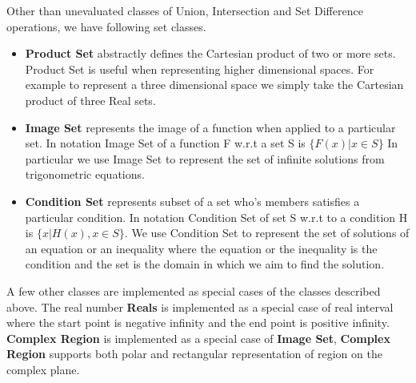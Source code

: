 
Other than unevaluated classes of Union, Intersection and Set Difference
operations, we have following set classes.

\begin{itemize}

    \item \textbf{Product Set} abstractly defines the Cartesian product of two
        or more sets. Product Set is useful when representing higher
        dimensional spaces. For example to represent a three dimensional space
        we simply take the Cartesian product of three Real sets.

    \item \textbf{Image Set} represents the image of a function when applied to
        a particular set. In notation Image Set of a function F w.r.t a set S
        is $\{ F(x) | x \in S \}$ In particular we use Image Set to represent the
        set of infinite solutions from trigonometric equations.


    \item \textbf{Condition Set} represents subset of a set who's members
        satisfies a particular condition. In notation Condition Set of set S
        w.r.t to a condition H is $\{x | H(x), x \in S \}$. We use Condition Set
        to represent the set of solutions of an equation or an inequality where
        the equation or the inequality is the condition and the set is the
        domain in which we aim to find the solution.


\end{itemize}

A few other classes are implemented as special cases of the classes described
above. The real number \textbf{Reals} is implemented as a special case of real
interval where the start point is negative infinity and the end point is
positive infinity. \textbf{Complex Region} is implemented as a special case of
\textbf{Image Set}, \textbf{Complex Region} supports both polar and rectangular
representation of region on the complex plane.
